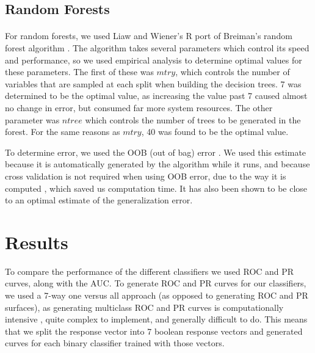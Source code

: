 \documentclass[12pt]{article}
\begin{document}
\subsection{Random Forests}
\paragraph{}
For random forests, we used Liaw and Wiener's R port \cite{liaw02} of Breiman's random forest algorithm \cite{breiman01}. The algorithm takes several parameters which control its speed and performance, so we used empirical analysis to determine optimal values for these parameters. The first of these was $mtry$, which controls the number of variables that are sampled at each split when building the decision trees. 7 was determined to be the optimal value, as increasing the value past 7 caused almost no change in error, but consumed far more system resources. The other parameter was $ntree$ which controls the number of trees to be generated in the forest. For the same reasons as $mtry$, 40 was found to be the optimal value.
\par
To determine error, we used the OOB (out of bag) error \cite{breiman96}. We used this estimate because it is automatically generated by the algorithm while it runs, and because cross validation is not required when using OOB error, due to the way it is computed \cite{breiman01, breiman96}, which saved us computation time. It has also been shown to be close to an optimal estimate of the generalization error\cite{breiman96}.

\section{Results}
To compare the performance of the different classifiers we used ROC and PR curves, along with the AUC. To generate ROC and PR curves for our classifiers, we used a 7-way one versus all approach (as opposed to generating ROC and PR surfaces), as generating multiclass ROC and PR curves is  computationally intensive \cite{lan07}, quite complex to implement, and generally difficult to do. This means that we split the response vector into 7 boolean response vectors and generated curves for each binary classifier trained with those vectors.
\end{document}
